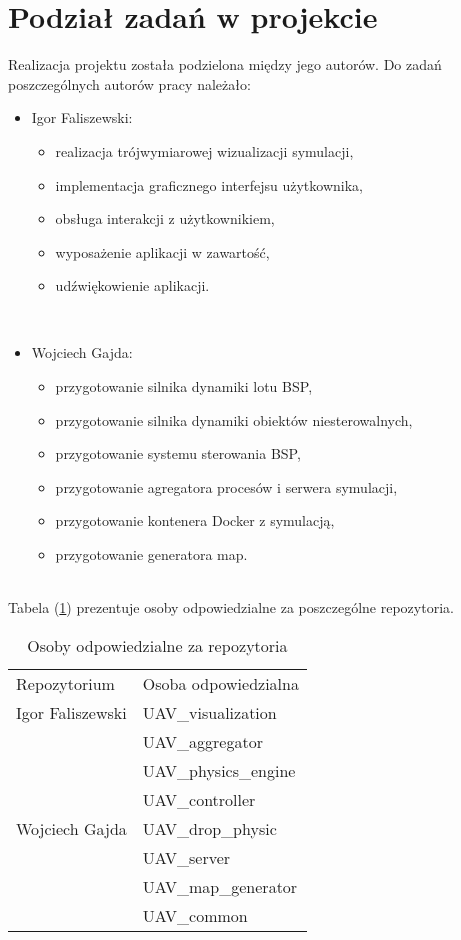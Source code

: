 \section*{Podział zadań w projekcie}

Realizacja projektu została podzielona między jego autorów. Do zadań poszczególnych autorów pracy należało:\\

\begin{itemize}[noitemsep,nolistsep]
	\item Igor Faliszewski:
	\begin{itemize}
		\item realizacja trójwymiarowej wizualizacji symulacji,
		\item implementacja graficznego interfejsu użytkownika,
		\item obsługa interakcji z użytkownikiem,
		\item wyposażenie aplikacji w zawartość,
		\item udźwiękowienie aplikacji.
	\end{itemize}
	\ \\
	\item Wojciech Gajda:
	\begin{itemize}
		\item przygotowanie silnika dynamiki lotu BSP,
		\item przygotowanie silnika dynamiki obiektów niesterowalnych,
		\item przygotowanie systemu sterowania BSP,
		\item przygotowanie agregatora procesów i serwera symulacji,
		\item przygotowanie kontenera Docker z symulacją,
		\item przygotowanie generatora map.
	\end{itemize}
\end{itemize}
\ \\
Tabela (\ref{rep_rep}) prezentuje osoby odpowiedzialne za poszczególne repozytoria.

\renewcommand{\arraystretch}{1.5}
\begin{table}[!h]
	\centering
	\begin{tabular}{|m{}|m{}|} 
		\hline
		\rowcolor{Gray}
		Repozytorium &  Osoba odpowiedzialna \\
		\multirow{1}{15em}{Igor Faliszewski} 
		& UAV\_visualization \\
		\hline
		\multirow{7}{15em}{{Wojciech Gajda}} 
		& UAV\_aggregator \\
		& UAV\_physics\_engine\\
		& UAV\_controller \\
		& UAV\_drop\_physic \\
		& UAV\_server \\
		& UAV\_map\_generator \\
		& UAV\_common \\
		\hline
	\end{tabular}
	\caption{Osoby odpowiedzialne za repozytoria}
	\label{rep_rep}
\end{table}